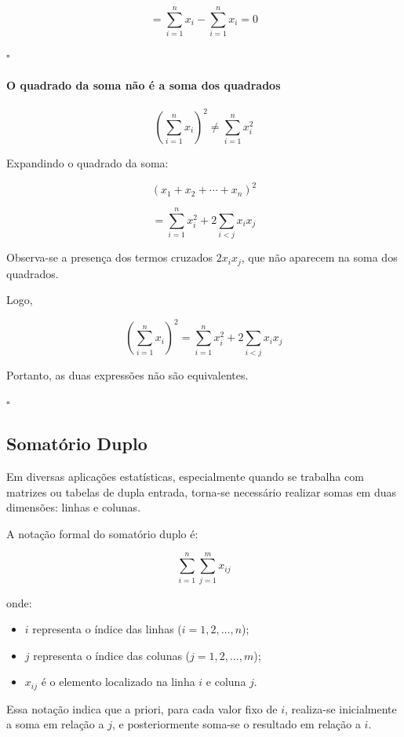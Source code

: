 \[
=
\sum_{i=1}^{n} x_i
-
\sum_{i=1}^{n} x_i
= 0
\]

\hfill $\square$

\paragraph{O quadrado da soma não é a soma dos quadrados}


\[
\left(\sum_{i=1}^{n} x_i\right)^2
\neq
\sum_{i=1}^{n} x_i^2
\]

Expandindo o quadrado da soma:

\[
(x_1 + x_2 + \cdots + x_n)^2
\]

\[
=
\sum_{i=1}^{n} x_i^2
+
2 \sum_{i<j} x_i x_j
\]

Observa-se a presença dos termos cruzados $2x_i x_j$, que não aparecem na soma dos quadrados.

Logo,

\[
\left(\sum_{i=1}^{n} x_i\right)^2
=
\sum_{i=1}^{n} x_i^2
+
2 \sum_{i<j} x_i x_j
\]

Portanto, as duas expressões não são equivalentes.

\hfill $\square$
\subsection{Somatório Duplo}

Em diversas aplicações estatísticas, especialmente quando se trabalha com matrizes ou tabelas de dupla entrada, torna-se necessário realizar somas em duas dimensões: linhas e colunas. \vskip0.3cm

A notação formal do somatório duplo é:

\[
\sum_{i=1}^{n} \sum_{j=1}^{m} x_{ij}
\]

onde:

\begin{itemize}
\item $i$ representa o índice das linhas ($i = 1,2,\ldots,n$);
\item $j$ representa o índice das colunas ($j = 1,2,\ldots,m$);
\item $x_{ij}$ é o elemento localizado na linha $i$ e coluna $j$.
\end{itemize}

Essa notação indica que a priori, para cada valor fixo de $i$, realiza-se inicialmente a soma em relação a $j$, e posteriormente soma-se o resultado em relação a $i$.

